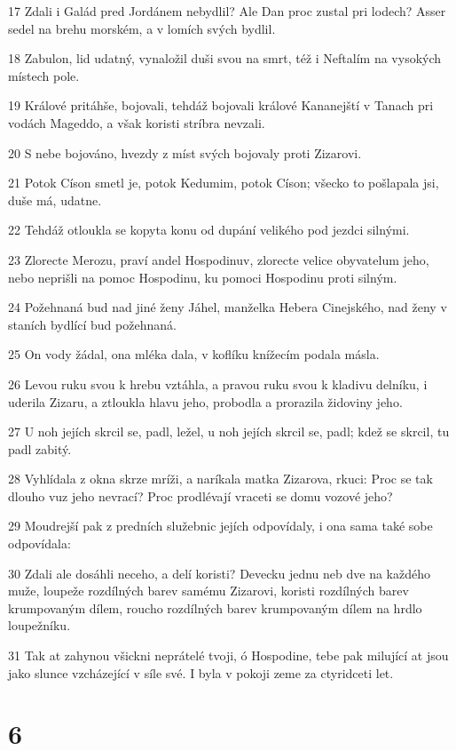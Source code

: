 \par 17 Zdali i Galád pred Jordánem nebydlil? Ale Dan proc zustal pri lodech? Asser sedel na brehu morském, a v lomích svých bydlil.
\par 18 Zabulon, lid udatný, vynaložil duši svou na smrt, též i Neftalím na vysokých místech pole.
\par 19 Králové pritáhše, bojovali, tehdáž bojovali králové Kananejští v Tanach pri vodách Mageddo, a však koristi stríbra nevzali.
\par 20 S nebe bojováno, hvezdy z míst svých bojovaly proti Zizarovi.
\par 21 Potok Císon smetl je, potok Kedumim, potok Císon; všecko to pošlapala jsi, duše má, udatne.
\par 22 Tehdáž otloukla se kopyta konu od dupání velikého pod jezdci silnými.
\par 23 Zlorecte Merozu, praví andel Hospodinuv, zlorecte velice obyvatelum jeho, nebo neprišli na pomoc Hospodinu, ku pomoci Hospodinu proti silným.
\par 24 Požehnaná bud nad jiné ženy Jáhel, manželka Hebera Cinejského, nad ženy v staních bydlící bud požehnaná.
\par 25 On vody žádal, ona mléka dala, v koflíku knížecím podala másla.
\par 26 Levou ruku svou k hrebu vztáhla, a pravou ruku svou k kladivu delníku, i uderila Zizaru, a ztloukla hlavu jeho, probodla a prorazila židoviny jeho.
\par 27 U noh jejích skrcil se, padl, ležel, u noh jejích skrcil se, padl; kdež se skrcil, tu padl zabitý.
\par 28 Vyhlídala z okna skrze mríži, a naríkala matka Zizarova, rkuci: Proc se tak dlouho vuz jeho nevrací? Proc prodlévají vraceti se domu vozové jeho?
\par 29 Moudrejší pak z predních služebnic jejích odpovídaly, i ona sama také sobe odpovídala:
\par 30 Zdali ale dosáhli neceho, a delí koristi? Devecku jednu neb dve na každého muže, loupeže rozdílných barev samému Zizarovi, koristi rozdílných barev krumpovaným dílem, roucho rozdílných barev krumpovaným dílem na hrdlo loupežníku.
\par 31 Tak at zahynou všickni neprátelé tvoji, ó Hospodine, tebe pak milující at jsou jako slunce vzcházející v síle své. I byla v pokoji zeme za ctyridceti let.

\chapter{6}

